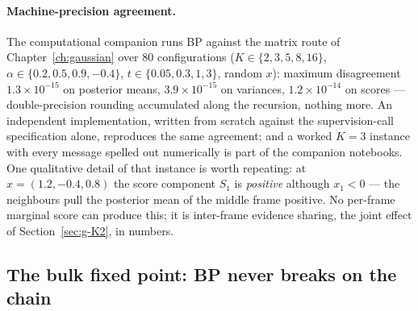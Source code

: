 \paragraph{Machine-precision agreement.} The computational companion runs
BP against the matrix route of Chapter~\ref{ch:gaussian} over $80$
configurations ($K \in \{2,3,5,8,16\}$, $\alpha \in \{0.2, 0.5, 0.9,
-0.4\}$, $t \in \{0.05, 0.3, 1, 3\}$, random $x$): maximum disagreement
$1.3 \times 10^{-15}$ on posterior means, $3.9 \times 10^{-15}$ on
variances, $1.2 \times 10^{-14}$ on scores --- double-precision rounding
accumulated along the recursion, nothing more. An independent
implementation, written from scratch against the supervision-call
specification alone, reproduces the same agreement; and a worked $K = 3$
instance with every message spelled out numerically is part of the
companion notebooks. One qualitative detail of that instance is worth
repeating: at $x = (1.2, -0.4, 0.8)$ the score component $S_1$ is
\emph{positive} although $x_1 < 0$ --- the neighbours pull the posterior
mean of the middle frame positive. No per-frame marginal score can produce
this; it is inter-frame evidence sharing, the joint effect of
Section~\ref{sec:g-K2}, in numbers.

\subsection{The bulk fixed point: BP never breaks on the chain}

